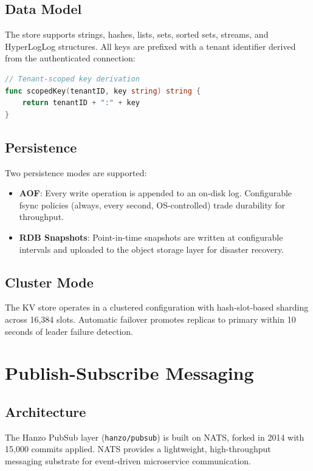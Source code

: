 \documentclass[11pt,a4paper]{article}
\begin{document}
\subsection{Data Model}

The store supports strings, hashes, lists, sets, sorted sets, streams, and HyperLogLog structures. All keys are prefixed with a tenant identifier derived from the authenticated connection:

\begin{lstlisting}[language=Go]
// Tenant-scoped key derivation
func scopedKey(tenantID, key string) string {
    return tenantID + ":" + key
}
\end{lstlisting}

\subsection{Persistence}

Two persistence modes are supported:
\begin{itemize}
    \item \textbf{AOF}: Every write operation is appended to an on-disk log. Configurable fsync policies (always, every second, OS-controlled) trade durability for throughput.
    \item \textbf{RDB Snapshots}: Point-in-time snapshots are written at configurable intervals and uploaded to the object storage layer for disaster recovery.
\end{itemize}

\subsection{Cluster Mode}

The KV store operates in a clustered configuration with hash-slot-based sharding across 16{,}384 slots. Automatic failover promotes replicas to primary within 10 seconds of leader failure detection.

\section{Publish-Subscribe Messaging}

\subsection{Architecture}

The Hanzo PubSub layer (\texttt{hanzo/pubsub}) is built on NATS, forked in 2014 with 15{,}000 commits applied. NATS provides a lightweight, high-throughput messaging substrate for event-driven microservice communication.
\end{document}
